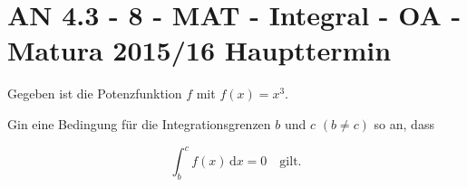 \section{AN 4.3 - 8 - MAT - Integral - OA - Matura 2015/16 Haupttermin}

\begin{beispiel}[AN 4.3]{1} %
Gegeben ist die Potenzfunktion $f$ mit $f(x) = x^3$.

Gin eine Bedingung für die Integrationsgrenzen $b$ und $c$ $(b \neq c)$ so an, dass

$$\int_{b}^{c}\! f(x)\, \mathrm{d}x=0 \quad \text{gilt.}$$ 


\end{beispiel}